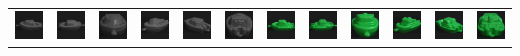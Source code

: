 \documentclass[dutch]{beamer}
\theoremstyle{definition}
\theoremstyle{remark}
\theoremstyle{example}
\begin{document}
{\begin{center}
\begin{tabular}{c@{\ }c@{}c@{}c@{}c@{}c c@{\ }c@{}c@{}c@{}c@{}c}
\includegraphics[width=0.8cm]{coil/beeld-24.eps} &
\includegraphics[width=0.8cm]{coil/beeld-25.eps} &
\includegraphics[width=0.8cm]{coil/beeld-26.eps} &
\includegraphics[width=0.8cm]{coil/beeld-27.eps} &
\includegraphics[width=0.8cm]{coil/beeld-28.eps} &
\includegraphics[width=0.8cm]{coil/beeld-29.eps} &

\includegraphics[width=0.8cm]{coil/beeld-54.eps} &
\includegraphics[width=0.8cm]{coil/beeld-55.eps} &
\includegraphics[width=0.8cm]{coil/beeld-56.eps} &
\includegraphics[width=0.8cm]{coil/beeld-57.eps} &
\includegraphics[width=0.8cm]{coil/beeld-58.eps} &
\includegraphics[width=0.8cm]{coil/beeld-59.eps} \\


\end{tabular}
\end{center}}
\end{document}
